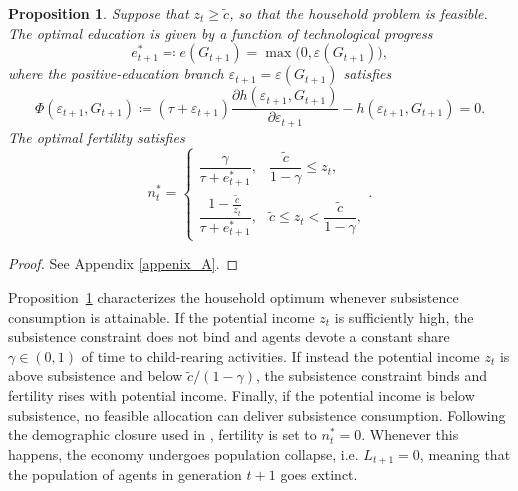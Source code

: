 \documentclass[a4paper,fleqn]{cas-sc}
\newtheorem{proposition}{Proposition}
\begin{document}
\begin{proposition}\label{prop:optimal_solution}
    Suppose that $z_t\geq \tilde c$, so that the household problem is feasible. The optimal education is given by a function of technological progress
    \begin{equation}\label{eq:optimal_et}
        e_{t+1}^*
        \eqqcolon
        e(G_{t+1})
        =
        \max\!\big(0,\varepsilon(G_{t+1})\big),
    \end{equation}
    where the positive-education branch $\varepsilon_{t+1} = \varepsilon(G_{t+1})$ satisfies
    \begin{equation}\label{eq:implicit_optimal_education}
        \Phi(\varepsilon_{t+1},G_{t+1})
        \coloneqq
        (\tau+\varepsilon_{t+1})
        \frac{\partial h(\varepsilon_{t+1},G_{t+1})}{\partial \varepsilon_{t+1}}
        -
        h(\varepsilon_{t+1},G_{t+1})
        =
        0.
    \end{equation}
    The optimal fertility satisfies
    \begin{equation}\label{eq:optimal_nt}
        n_t^*
        =
        \begin{cases}
            \dfrac{\gamma}{\tau+e_{t+1}^*},
            &
            \dfrac{\tilde c}{1-\gamma}\leq z_t,
            \\[10pt]
            \dfrac{1-\frac{\tilde c}{z_t}}{\tau+e_{t+1}^*},
            &
            \tilde c\leq z_t<\dfrac{\tilde c}{1-\gamma},
        \end{cases}.
    \end{equation}
\end{proposition}

\begin{proof}
    See Appendix \ref{appenix_A}. 
\end{proof}
%
Proposition~\ref{prop:optimal_solution} characterizes the household optimum whenever subsistence consumption is attainable. If the potential income $z_t$ is sufficiently high, the subsistence constraint does not bind and agents devote a constant share $\gamma\in(0,1)$ of time to child-rearing activities. 
If instead the potential income $z_t$ is above subsistence and below $\tilde c/(1-\gamma)$, the subsistence constraint binds and fertility rises with potential income. 
Finally, if the potential income is below subsistence, no feasible allocation can deliver subsistence consumption. Following the demographic closure used in \citet{Lagerlof2006}, fertility is set to $n_t^*=0$. Whenever this happens, the economy undergoes population collapse, i.e. $L_{t+1}=0$, meaning that the population of agents in generation $t+1$ goes extinct.
\end{document}
